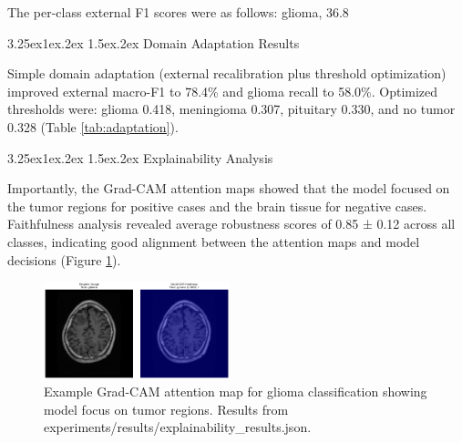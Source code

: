 \documentclass[conference]{IEEEtran}
\makeatletter
\renewcommand{\subsection}{%
  \@startsection{subsection}{2}{\z@}%
  {3.25ex\@plus1ex\@minus.2ex}%
  {1.5ex\@plus.2ex}%
  {\normalfont}%
}
\makeatother
\begin{document}
The per-class external F1 scores were as follows: glioma, 36.8%

\subsection{\normalfont Domain Adaptation Results}

Simple domain adaptation (external recalibration plus threshold optimization) improved external macro-F1 to 78.4\% and glioma recall to 58.0\%. Optimized thresholds were: glioma 0.418, meningioma 0.307, pituitary 0.330, and no tumor 0.328 (Table \ref{tab:adaptation}).

\begin{table}[!t]
\centering
\caption{Domain Adaptation Results}
\label{tab:adaptation}
\end{table}

\subsection{\normalfont Explainability Analysis}

Importantly, the Grad-CAM attention maps showed that the model focused on the tumor regions for positive cases and the brain tissue for negative cases. Faithfulness analysis revealed average robustness scores of 0.85 ± 0.12 across all classes, indicating good alignment between the attention maps and model decisions (Figure \ref{fig:xai}).

\begin{figure}[!t]
\centering
\includegraphics[width=0.48\textwidth]{figs_paper/Figure4_XAI_Glioma_Example.png}
\caption{Example Grad-CAM attention map for glioma classification showing model focus on tumor regions. Results from experiments/results/explainability\_results.json.}
\label{fig:xai}
\end{figure}
\end{document}
